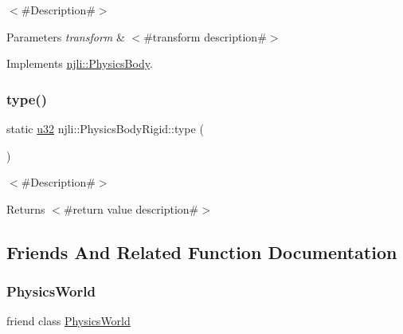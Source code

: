 $<$\#\+Description\#$>$


\begin{DoxyParams}{Parameters}
{\em transform} & $<$\#transform description\#$>$ \\
\hline
\end{DoxyParams}


Implements \mbox{\hyperlink{classnjli_1_1_physics_body_a570891a03ea4f8243ccec9202b3dc965}{njli\+::\+Physics\+Body}}.

\mbox{\label{classnjli_1_1_physics_body_rigid_a99dba252410763fe9ac82424321add06}} 
\subsubsection{\texorpdfstring{type()}{type()}}
{\footnotesize\ttfamily static \mbox{\hyperlink{_util_8h_a10e94b422ef0c20dcdec20d31a1f5049}{u32}} njli\+::\+Physics\+Body\+Rigid\+::type (\begin{DoxyParamCaption}{ }\end{DoxyParamCaption})\hspace{0.3cm}{\ttfamily [static]}}

$<$\#\+Description\#$>$

\begin{DoxyReturn}{Returns}
$<$\#return value description\#$>$ 
\end{DoxyReturn}


\subsection{Friends And Related Function Documentation}
\mbox{\label{classnjli_1_1_physics_body_rigid_abd7959b8cbcd7c25bc6c0c8b1ea26ce6}} 
\subsubsection{\texorpdfstring{Physics\+World}{PhysicsWorld}}
{\footnotesize\ttfamily friend class \mbox{\hyperlink{classnjli_1_1_physics_world}{Physics\+World}}\hspace{0.3cm}{\ttfamily [friend]}}



